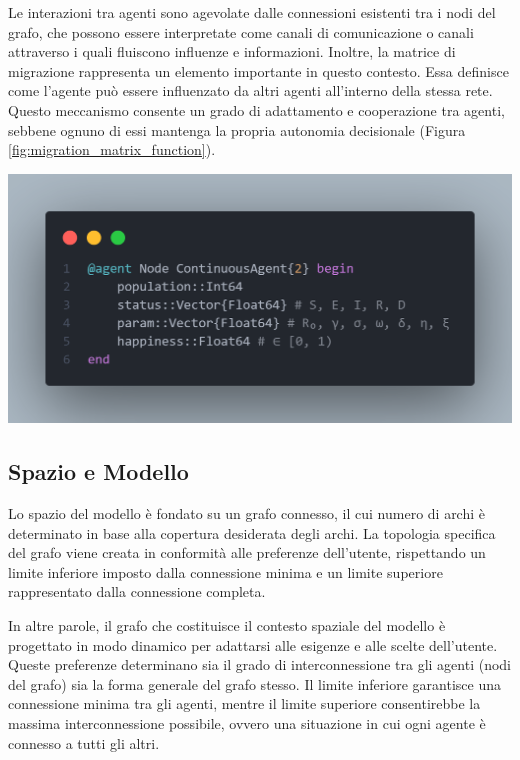 Le interazioni tra agenti sono agevolate dalle connessioni esistenti 
tra i nodi del grafo, che possono essere interpretate come canali di 
comunicazione o canali attraverso i quali fluiscono influenze e 
informazioni. Inoltre, la matrice di migrazione rappresenta un elemento 
importante in questo contesto. Essa definisce come l'agente può essere 
influenzato da altri agenti all'interno della stessa rete. 
Questo meccanismo consente un grado di adattamento e cooperazione tra 
agenti, sebbene ognuno di essi mantenga la propria autonomia decisionale
(Figura \ref{fig:migration_matrix_function}).

\begin{minipage}{\linewidth}
    \centering
    \includegraphics[width=\textwidth]{img/node_agent.png}
    \label{fig:Agent_code}
\end{minipage}
\newpage

\subsection{Spazio e Modello}
Lo spazio del modello è fondato su un grafo connesso, il cui numero 
di archi è determinato in base alla copertura desiderata degli archi. 
La topologia specifica del grafo viene creata in conformità alle 
preferenze dell'utente, rispettando un limite inferiore imposto dalla 
connessione minima e un limite superiore rappresentato dalla connessione 
completa.

In altre parole, il grafo che costituisce il contesto spaziale del 
modello è progettato in modo dinamico per adattarsi alle esigenze e 
alle scelte dell'utente. Queste preferenze determinano sia il grado di 
interconnessione tra gli agenti (nodi del grafo) sia la forma generale 
del grafo stesso. Il limite inferiore garantisce una connessione minima 
tra gli agenti, mentre il limite superiore consentirebbe la massima 
interconnessione possibile, ovvero una situazione in cui ogni agente è 
connesso a tutti gli altri.

